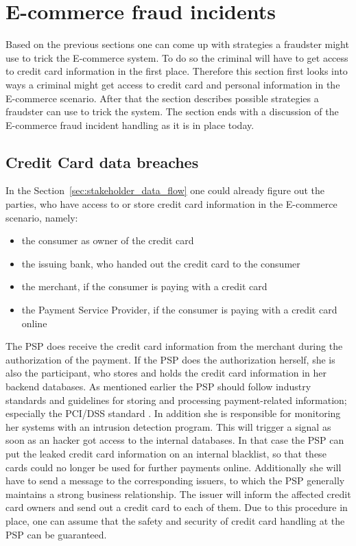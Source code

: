 
\section{E-commerce fraud incidents}
\label{sec:scenario_fraud}

Based on the previous sections one can come up with strategies a fraudster might use to trick the E-commerce system. To do so the criminal will have to get access to credit card information in the first place. Therefore this section first looks into ways a criminal might get access to credit card and personal information in the E-commerce scenario. After that the section describes possible strategies a fraudster can use to trick the system. The section ends with a discussion of the E-commerce fraud incident handling as it is in place today.

\subsection{Credit Card data breaches}
\label{subsec:leaking_credit_cards}

 In the Section~\ref{sec:stakeholder_data_flow} one could already figure out the parties, who have access to or store credit card information in the E-commerce scenario, namely:\@

\begin{itemize}
  \item the consumer as owner of the credit card
  \item the issuing bank, who handed out the credit card to the consumer
  \item the merchant, if the consumer is paying with a credit card
  \item the Payment Service Provider, if the consumer is paying with a credit card online
\end{itemize}

The \gls{PSP} does receive the credit card information from the merchant during the authorization of the payment. If the \gls{PSP} does the authorization herself, she is also the participant, who stores and holds the credit card information in her backend databases. As mentioned earlier the \gls{PSP} should follow industry standards and guidelines for storing and processing payment-related information; especially the PCI/DSS standard \citep{virtue2009payment}. In addition she is responsible for monitoring her systems with an intrusion detection program. This will trigger a signal as soon as an hacker got access to the internal databases. In that case the \gls{PSP} can put the leaked credit card information on an internal blacklist, so that these cards could no longer be used for further payments online. Additionally she will have to send a message to the corresponding issuers, to which the \gls{PSP} generally maintains a strong business relationship. The issuer will inform the affected credit card owners and send out a credit card to each of them. Due to this procedure in place, one can assume that the safety and security of credit card handling at the \gls{PSP} can be guaranteed. \\

